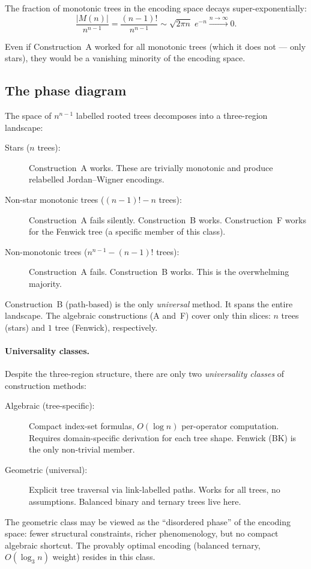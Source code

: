 \begin{corollary}
The fraction of monotonic trees in the encoding space decays
super-exponentially:
\begin{equation}
  \frac{|M(n)|}{n^{n-1}}
    = \frac{(n{-}1)!}{n^{n-1}}
    \sim \sqrt{2\pi n}\; e^{-n}
    \xrightarrow{n \to \infty} 0.
\end{equation}
\end{corollary}

Even if Construction~A worked for all monotonic trees (which it does
not --- only stars), they would be a vanishing minority of the encoding
space.

\subsection{The phase diagram}
\label{sec:pb-phase}

The space of $n^{n-1}$ labelled rooted trees decomposes into a
three-region landscape:

\begin{description}
  \item[Stars ($n$ trees):] Construction~A works.  These are
    trivially monotonic and produce relabelled Jordan--Wigner
    encodings.

  \item[Non-star monotonic trees ($(n{-}1)! - n$ trees):] 
    Construction~A fails silently.  Construction~B works.
    Construction~F works for the Fenwick tree (a specific member
    of this class).

  \item[Non-monotonic trees ($n^{n-1} - (n{-}1)!$ trees):]
    Construction~A fails.  Construction~B works.  This is the
    overwhelming majority.
\end{description}

Construction~B (path-based) is the only \emph{universal} method.
It spans the entire landscape.  The algebraic constructions (A and~F)
cover only thin slices: $n$ trees (stars) and $1$ tree (Fenwick),
respectively.


\paragraph{Universality classes.}
Despite the three-region structure, there are only two
\emph{universality classes} of construction methods:
\begin{description}
  \item[Algebraic (tree-specific):] Compact index-set formulas,
    $O(\log n)$ per-operator computation.  Requires domain-specific
    derivation for each tree shape.  Fenwick (BK) is the only
    non-trivial member.
  \item[Geometric (universal):] Explicit tree traversal via
    link-labelled paths.  Works for all trees, no assumptions.
    Balanced binary and ternary trees live here.
\end{description}

The geometric class may be viewed as the ``disordered phase'' of the
encoding space: fewer structural constraints, richer phenomenology,
but no compact algebraic shortcut.  The provably optimal encoding
(balanced ternary, $O(\log_3 n)$ weight) resides in this class.
